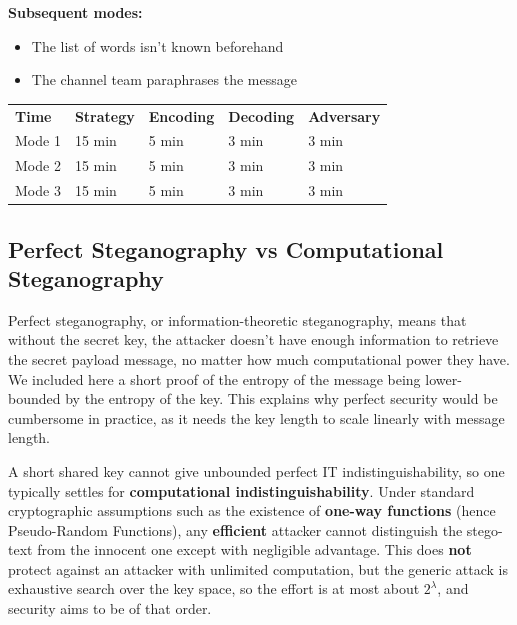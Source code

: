 \documentclass[11pt]{article}
\begin{document}
\textbf{Subsequent modes:}

\begin{itemize}
  \item The list of words isn't known beforehand
  \item The channel team paraphrases the message
\end{itemize}

\begin{center}
\begin{tabular}{lllll}
\textbf{Time} & \textbf{Strategy} & \textbf{Encoding} & \textbf{Decoding} & \textbf{Adversary} \\
Mode 1 & 15 min & 5 min & 3 min & 3 min \\
Mode 2 & 15 min & 5 min & 3 min & 3 min \\
Mode 3 & 15 min & 5 min & 3 min & 3 min \\
\end{tabular}
\end{center}


\subsection{Perfect Steganography vs Computational Steganography}
\label{sec:perfect-vs-computational}

Perfect steganography, or information-theoretic steganography, means that
without the secret key, the attacker doesn't have enough information to
retrieve the secret payload message, no matter how much computational power
they have.
We included here a short proof of the entropy of the message being
lower-bounded by the entropy of the key. This explains why perfect security
would be cumbersome in practice, as it needs the key length to scale linearly
with message length.

A short shared key cannot give unbounded perfect IT indistinguishability, so
one typically settles for \textbf{computational indistinguishability}. Under
standard cryptographic assumptions such as the existence of \textbf{one-way
functions} (hence Pseudo-Random Functions), any \textbf{efficient} attacker
cannot distinguish the stego-text from the innocent one except with negligible
advantage. This does \textbf{not} protect against an attacker with unlimited
computation, but the generic attack is exhaustive search over the key space, so
the effort is at most about $2^{\lambda}$, and security aims to be of that
order.
\end{document}
